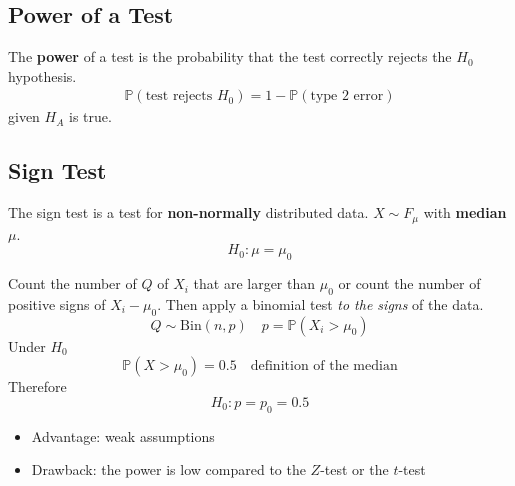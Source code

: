 \subsection{Power of a Test}
The \textbf{power} of a test is the probability that the test correctly rejects the $H_0$ hypothesis.
\begin{gather*}
    \mathbb{P}(\text{test rejects }H_0) = 1-\mathbb{P}(\text{type 2 error})
\end{gather*}
given $H_A$ is true. %

\subsection{Sign Test}
The sign test is a test for \textbf{non-normally} distributed data.
\newpar{}
$X \sim F_\mu$ with \textbf{median} $\mu$.
\newpar{}
\begin{equation*}
    H_0:\mu = \mu_0
\end{equation*}
\newpar{}

Count the number of $Q$ of $X_i$ that are larger than $\mu_0$ or count the number of positive signs of $X_i-\mu_0$. Then apply a binomial test \textit{to the signs} of the data.
\begin{equation*}
    Q \sim \text{Bin}(n,p) \quad p=\mathbb{P}(X_i > \mu_0)
\end{equation*}
Under $H_0$
\begin{equation*}
    \mathbb{P}(X > \mu_0)=0.5 \quad \text{definition of the median}
\end{equation*}
Therefore
\begin{equation*}
    H_0: p=p_0=0.5
\end{equation*}

\newpar{}
\begin{itemize}
    \item Advantage: weak assumptions
    \item Drawback: the power is low compared to the $Z$-test or the $t$-test
\end{itemize}

